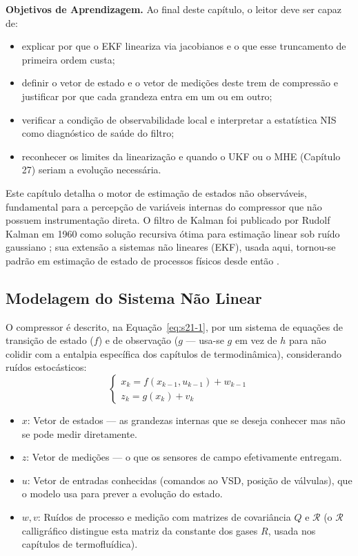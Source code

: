 \documentclass[12pt,a4paper]{article}
\numberwithin{equation}{section}
\numberwithin{table}{section}
\numberwithin{figure}{section}
\begin{document}
	\textbf{Objetivos de Aprendizagem.} Ao final deste capítulo, o leitor
	deve ser capaz de:
	\begin{itemize}
		\item explicar por que o EKF lineariza via jacobianos e o que esse
		truncamento de primeira ordem custa;
		\item definir o vetor de estado e o vetor de medições deste trem
		de compressão e justificar por que cada grandeza entra em um ou
		em outro;
		\item verificar a condição de observabilidade local e interpretar
		a estatística NIS como diagnóstico de saúde do filtro;
		\item reconhecer os limites da linearização e quando o UKF ou o
		MHE (Capítulo 27) seriam a evolução necessária.
	\end{itemize}

	Este capítulo detalha o motor de estimação de estados não observáveis, fundamental para a percepção de variáveis internas do compressor que não possuem instrumentação direta. O filtro de Kalman foi publicado por Rudolf Kalman em 1960 como solução recursiva ótima para estimação linear sob ruído gaussiano \cite{kalman}; sua extensão a sistemas não lineares (EKF), usada aqui, tornou-se padrão em estimação de estado de processos físicos desde então \cite{simon}.
	
	\subsection{Modelagem do Sistema Não Linear}
	O compressor é descrito, na Equação~\eqref{eq:s21-1}, por um sistema de equações de transição de estado ($f$) e de observação ($g$ — usa-se $g$ em vez de $h$ para não colidir com a entalpia específica dos capítulos de termodinâmica), considerando ruídos estocásticos:
	\begin{equation}\label{eq:s21-1}
	\begin{cases}
		x_k = f(x_{k-1}, u_{k-1}) + w_{k-1} \\
		z_k = g(x_k) + v_k
	\end{cases}
\end{equation}
	\begin{itemize}
		\item $x$: Vetor de estados — as grandezas internas que se deseja conhecer mas não se pode medir diretamente.
		\item $z$: Vetor de medições — o que os sensores de campo efetivamente entregam.
		\item $u$: Vetor de entradas conhecidas (comandos ao VSD, posição de válvulas), que o modelo usa para prever a evolução do estado.
		\item $w, v$: Ruídos de processo e medição com matrizes de covariância $Q$ e $\mathcal{R}$ (o $\mathcal{R}$ calligráfico distingue esta matriz da constante dos gases $R$, usada nos capítulos de termofluídica).
	\end{itemize}
\end{document}
